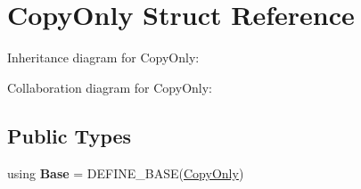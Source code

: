 \hypertarget{struct_copy_only}{}\section{Copy\+Only Struct Reference}
\label{struct_copy_only}


Inheritance diagram for Copy\+Only\+:


Collaboration diagram for Copy\+Only\+:
\subsection*{Public Types}
\begin{DoxyCompactItemize}
\item 
\mbox{\label{struct_copy_only_ab301a3ec3cb5e88c683d9c91ca009b04}} 
using {\bfseries Base} = D\+E\+F\+I\+N\+E\+\_\+\+B\+A\+SE(\mbox{\hyperlink{struct_copy_only}{Copy\+Only}})
\end{DoxyCompactItemize}
